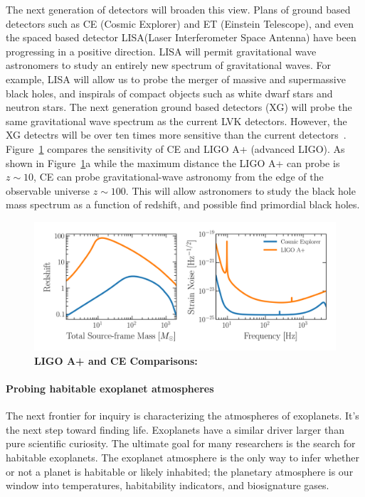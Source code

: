 The next generation  of detectors will broaden this view. 
Plans of ground based detectors such as CE (Cosmic Explorer) and ET (Einstein Telescope), and even the spaced based detector LISA(Laser Interferometer Space Antenna) have been progressing in a positive direction. 
LISA will permit gravitational wave astronomers to study an entirely new spectrum of gravitational waves. 
For example, LISA will allow us to probe the merger of massive and supermassive black holes, and inspirals of compact objects such as white dwarf stars and neutron stars. 
The next generation ground based detectors (XG) will probe the same gravitational wave spectrum as the current LVK detectors. 
However, the XG detectrs will be over ten times more sensitive than the current detectors~\cite{}. 
Figure~\ref{fig:ligo_vs_ce} compares the sensitivity of CE and LIGO A+ (advanced LIGO). 
As shown in Figure~\ref{fig:ligo_vs_ce}a while the maximum distance the LIGO A+ can probe is $z\sim10$, CE can probe gravitational-wave astronomy from the edge of the observable universe $z\sim100$. 
This will allow astronomers to study the black hole mass spectrum as a function of redshift, and possible find primordial black holes.
\begin{figure}
\begin{center}
  \centerline{\includegraphics[width=1.\linewidth]{src/figures/ligo_vs_ce.png}}
  \caption{\textbf{LIGO A+ and CE Comparisons:}  }
  \label{fig:ligo_vs_ce}
\end{center}
\end{figure}


\paragraph{Probing habitable exoplanet atmospheres}
The next frontier for inquiry is characterizing the atmospheres of exoplanets. 
It's the next step toward finding life. 
Exoplanets have a similar driver larger than pure scientific curiosity. 
The ultimate goal
for many researchers is the search for habitable exoplanets. 
The exoplanet atmosphere
is the only way to infer whether or not a planet is habitable or likely inhabited; the
planetary atmosphere is our window into temperatures, habitability indicators, and
biosignature gases.


